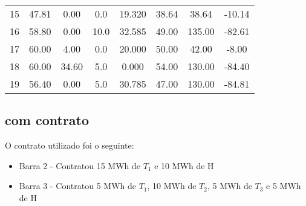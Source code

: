 \documentclass[a4paper,12pt,twoside]{article}
\begin{document}
\begin{center}
\begin{tabular}{ c c c c c c c c }
        15   & 47.81     & 0.00      & 0.0  & 19.320   & 38.64   & 38.64  & -10.14 \\
        16   & 58.80     & 0.00     & 10.0  & 32.585   & 49.00  & 135.00  & -82.61 \\
        17   & 60.00     & 4.00      & 0.0  & 20.000   & 50.00   & 42.00   & -8.00 \\
        18   & 60.00    & 34.60      & 5.0   & 0.000   & 54.00  & 130.00  & -84.40 \\
        19   & 56.40     & 0.00      & 5.0  & 30.785   & 47.00  & 130.00  & -84.81
    \end{tabular}
\end{center}

\subsection{com contrato}
O contrato utilizado foi o seguinte:
\begin{itemize}
    \item{Barra 2 - Contratou 15 MWh de \(T_1\) e 10 MWh de H}
    \item{Barra 3 - Contratou 5 MWh de \(T_1\), 10 MWh de \(T_2\), 5 MWh de \(T_3\) e 5 MWh de H}
\end{itemize}
\end{document}
